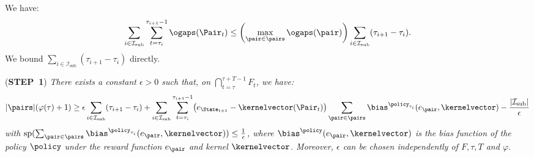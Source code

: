 \documentclass[preprint,cleveref,12pt]{colt2025}
\DeclarePairedDelimiter{\parens}{(}{)}	%
\DeclarePairedDelimiter{\abs}{\lvert}{\rvert}	%
\newcommand{\vecspan}[1]{\mathrm{sp}\parens{#1}}
\def\kernel{\kernelvector}
\def\STEP#1{(\strong{STEP~#1})}
\newcommand{\strong}[1]{\textbf{#1}}
\begin{document}
    We have:
    \begin{equation}
    \label{equation_coherence_suboptimal_segments}
        \sum_{i \in \mathcal{I}_\mathrm{sub}} 
        \sum_{t=\tau_i}^{\tau_{i+1}-1} 
        \ogaps(\Pair_t)
        \le 
        \parens*{\max_{\pair \in \pairs} \ogaps(\pair)}
        \sum_{i \in \mathcal{I}_\mathrm{sub}} 
        (\tau_{i+1} - \tau_i)
        .
    \end{equation}
    We bound $\sum_{i \in \mathcal{I}_\mathrm{sub}} (\tau_{i+1} - \tau_i)$ directly.

    \bigskip
    \noindent
    \STEP{1}
    \textit{
        There exists a constant $\epsilon > 0$ such that, on $\bigcap_{t = \tau}^{\tau + T - 1} F_t$, we have:
        \begin{equation}
            \label{equation_coherence_suboptimal_1}
            \abs{\pairs}\parens{\varphi(\tau) + 1}
            \ge 
            \epsilon 
            \sum_{i \in \mathcal{I}_\mathrm{sub}} 
            (\tau_{i+1} - \tau_i)
            +
            \sum_{i \in \mathcal{I}_\mathrm{sub}} 
            \sum_{t=\tau_i}^{\tau_{i+1}-1}
            \parens*{
                e_{\State_{t+1}} - \kernel(\Pair_t)
            } \sum_{\pair \in \pairs} \bias^{\policy_{\tau_i}}(e_\pair, \kernel)
            - \frac {\abs{\mathcal{I}_\mathrm{sub}}}\epsilon
        \end{equation}
        with $\vecspan{\sum_{\pair \in \pairs} \bias^{\policy_{\tau_i}}(e_\pair, \kernel)} \le \frac 1\epsilon$, where $\bias^\policy(e_\pair, \kernel)$ is the bias function of the policy $\policy$ under the reward function $e_\pair$ and kernel $\kernel$.
        Moreover, $\epsilon$ can be chosen independently of $F, \tau, T$ and $\varphi$. 
    }
    \medskip
\end{document}
